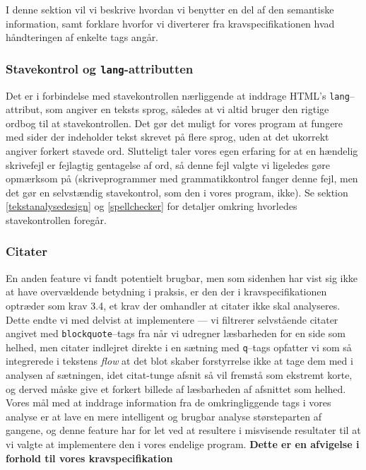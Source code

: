 \documentclass[a4paper,oneside]{memoir}
\begin{document}
I denne sektion vil vi beskrive hvordan vi benytter en del af den
semantiske information, samt forklare hvorfor vi diverterer fra
kravspecifikationen hvad håndteringen af enkelte tags angår.

\subsubsection{Stavekontrol og \texttt{lang}-attributten}
\label{stavekontrolsprog}
Det er i forbindelse med stavekontrollen nærliggende at inddrage
HTML's \texttt{lang}--attribut, som angiver en teksts sprog, således
at vi altid bruger den rigtige ordbog til at stavekontrollen. Det gør
det muligt for vores program at fungere med sider der indeholder tekst
skrevet på flere sprog, uden at det ukorrekt angiver forkert stavede
ord. Slutteligt taler vores egen erfaring for at en hændelig
skrivefejl er fejlagtig gentagelse af ord, så denne fejl valgte vi
ligeledes gøre opmærksom på (skriveprogrammer med grammatikkontrol
fanger denne fejl, men det gør en selvstændig stavekontrol, som den i
vores program, ikke). Se sektion \ref{tekstanalysedesign} og
\ref{spellchecker} for detaljer omkring hvorledes stavekontrollen
foregår.

\subsubsection{Citater}
\label{citater}
En anden feature vi fandt potentielt brugbar, men som sidenhen har
vist sig ikke at have overvældende betydning i praksis, er den der i
kravspecifikationen optræder som krav 3.4, et krav der omhandler at
citater ikke skal analyseres. Dette endte vi med delvist at
implementere --- vi filtrerer selvstående citater angivet med
\texttt{blockquote}--tags fra når vi udregner læsbarheden for en side
som helhed, men citater indlejret direkte i en sætning med
\texttt{q}--tags opfatter vi som så integrerede i tekstens
\textit{flow} at det blot skaber forstyrrelse ikke at tage dem med i
analysen af sætningen, idet citat-tunge afsnit så vil fremstå som
ekstremt korte, og derved måske give et forkert billede af læsbarheden
af afsnittet som helhed. Vores mål med at inddrage information fra de
omkringliggende tags i vores analyse er at lave en mere intelligent og
brugbar analyse størsteparten af gangene, og denne feature har for let
ved at resultere i misvisende resultater til at vi valgte at
implementere den i vores endelige program. \textbf{Dette er en
  afvigelse i forhold til vores kravspecifikation}
\end{document}

